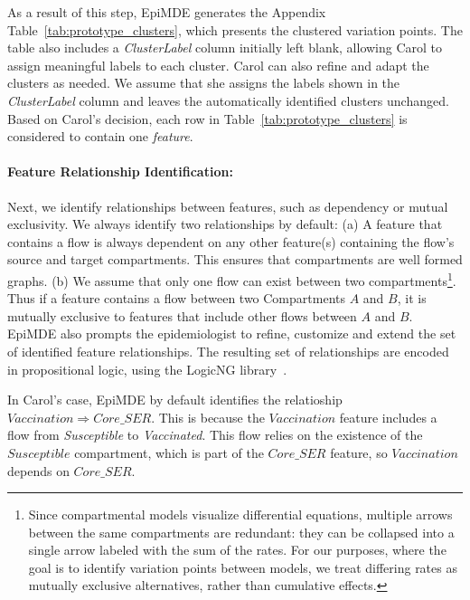 As a result of this step, EpiMDE generates the Appendix Table~\ref{tab:prototype_clusters}, which presents the clustered variation points. 
The table also includes a \textit{ClusterLabel} column initially left blank, allowing Carol to assign meaningful labels to each cluster. 
Carol can also refine and adapt the clusters as needed. 
We assume that she assigns the labels shown in the \textit{ClusterLabel} column and leaves the automatically identified clusters unchanged. 
Based on Carol's decision, each row in Table~\ref{tab:prototype_clusters} is considered to contain one \textit{feature}. 



\paragraph{Feature Relationship Identification:} Next, we identify relationships between features, such as dependency or mutual exclusivity. 
We always identify two relationships by default: 
(a)    A feature that contains a flow is always dependent on any other feature(s) containing the flow's source and target compartments. This ensures that compartments are well formed graphs.
(b)    We assume that only one flow can exist between two compartments\footnote{Since compartmental models visualize differential equations, multiple arrows between the same compartments are redundant: they can be collapsed into a single arrow labeled with the sum of the rates. For our purposes, where the goal is to identify variation points between models, we treat differing rates as mutually exclusive alternatives, rather than cumulative effects.}. Thus if a feature contains a flow between two Compartments $A$ and $B$, it is mutually exclusive to  features that include other flows between $A$ and $B$.
EpiMDE also prompts the epidemiologist to refine, customize and extend the set of identified feature relationships.
The resulting set of relationships are encoded in propositional logic, using the LogicNG library~\cite{logicng}.

In Carol's case, 
EpiMDE by default identifies the relatioship $Vaccination \Rightarrow Core\_SER$. 
This is because the $Vaccination$ feature includes a flow from \textit{Susceptible} to \textit{Vaccinated}. 
This flow relies on the existence of the $Susceptible$ compartment, which is part of the $Core\_SER$ feature, so $Vaccination$ depends on $Core\_SER$. 

